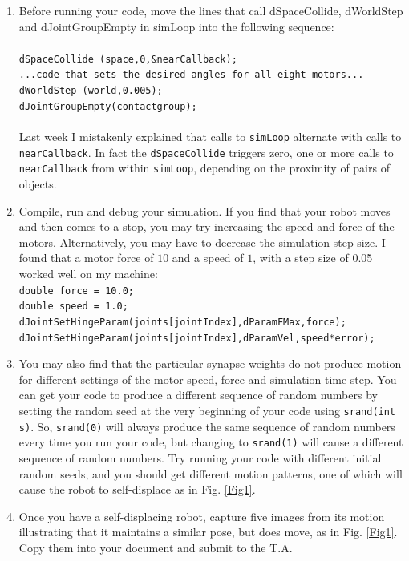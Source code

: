 \documentclass[12pt]{article}
\begin{document}
\begin{enumerate}
\item Before running your code, move the lines that call dSpaceCollide, dWorldStep and dJointGroupEmpty in simLoop into the following sequence: \\ \\
    \texttt{dSpaceCollide (space,0,\&nearCallback);} \\
    \texttt{...code that sets the desired angles for all eight motors...} \\
    \texttt{dWorldStep (world,0.005);} \\
    \texttt{dJointGroupEmpty(contactgroup);} \\ \\
    Last week I mistakenly explained that calls to \texttt{simLoop} alternate with calls to \texttt{nearCallback}. In fact the \texttt{dSpaceCollide} triggers zero, one or more calls to \texttt{nearCallback} from within \texttt{simLoop}, depending on the proximity of pairs of objects.

\item Compile, run and debug your simulation. If you find that your robot moves and then comes to a stop, you may try increasing the speed and force of the motors. Alternatively, you may have to decrease the simulation step size. I found that a motor force of $10$ and a speed of $1$, with a step size of 0.05 worked well on my machine: \\

    \texttt{double force = 10.0;}\\
    \texttt{double speed = 1.0;}\\
    \texttt{dJointSetHingeParam(joints[jointIndex],dParamFMax,force);}\\
    \texttt{dJointSetHingeParam(joints[jointIndex],dParamVel,speed*error);}\\

\item You may also find that the particular synapse weights do not produce motion for different settings of the motor speed, force and simulation time step. You can get your code to produce a different sequence of random numbers by setting the random seed at the very beginning of your code using \texttt{srand(int s)}. So, \texttt{srand(0)} will always produce the same sequence of random numbers every time you run your code, but changing to \texttt{srand(1)} will cause a different sequence of random numbers. Try running your code with different initial random seeds, and you should get different motion patterns, one of which will cause the robot to self-displace as in Fig. \ref{Fig1}.

\item Once you have a self-displacing robot, capture five images from its motion illustrating that it maintains a similar pose, but does move, as in Fig. \ref{Fig1}. Copy them into your document and submit to the T.A.

\end{enumerate}
\end{document}
